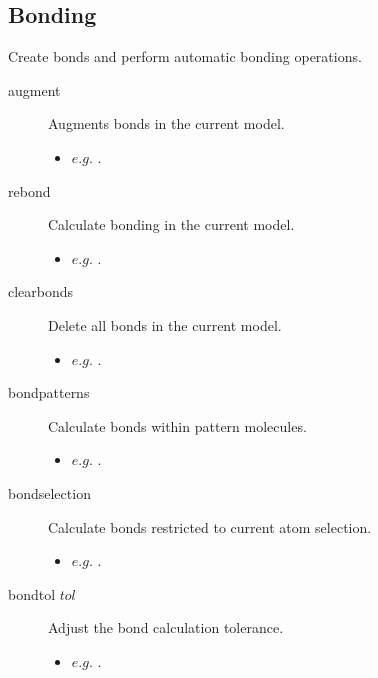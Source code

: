 \subsection{Bonding}
Create bonds and perform automatic bonding operations.\\
\begin{description}

	\item[augment\its] Augments bonds in the current model.
	\begin{itemize}
		\item $e.g.$ .
	\end{itemize}

	\item[rebond\its] Calculate bonding in the current model.
	\begin{itemize}
		\item $e.g.$ .
	\end{itemize}

	\item[clearbonds\its] Delete all bonds in the current model.
	\begin{itemize}
		\item $e.g.$ .
	\end{itemize}

	\item[bondpatterns\its] Calculate bonds within pattern molecules.
	\begin{itemize}
		\item $e.g.$ .
	\end{itemize}

	\item[bondselection\its] Calculate bonds restricted to current atom selection.
	\begin{itemize}
		\item $e.g.$ .
	\end{itemize}

	\item[bondtol $tol$\its] Adjust the bond calculation tolerance.
	\begin{itemize}
		\item $e.g.$ .
	\end{itemize}

\end{description}


